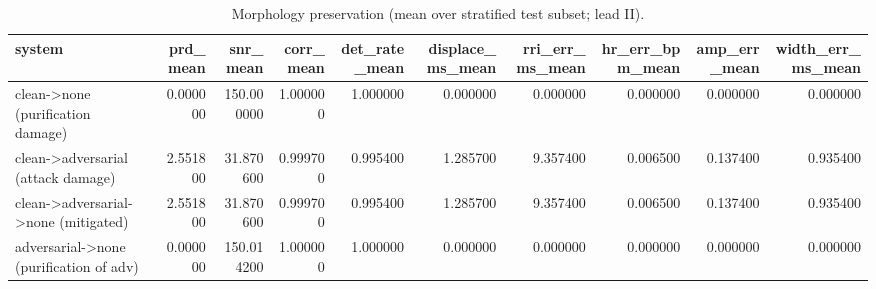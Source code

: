 \begin{table}[htbp]\centering\caption{Morphology preservation (mean over stratified test subset; lead II).}\label{tab:morph}
\begin{tabular}{lrrrrrrrrr}
\toprule
system & prd_mean & snr_mean & corr_mean & det_rate_mean & displace_ms_mean & rri_err_ms_mean & hr_err_bpm_mean & amp_err_mean & width_err_ms_mean \\
\midrule
clean->none (purification damage) & 0.000000 & 150.000000 & 1.000000 & 1.000000 & 0.000000 & 0.000000 & 0.000000 & 0.000000 & 0.000000 \\
clean->adversarial (attack damage) & 2.551800 & 31.870600 & 0.999700 & 0.995400 & 1.285700 & 9.357400 & 0.006500 & 0.137400 & 0.935400 \\
clean->adversarial->none (mitigated) & 2.551800 & 31.870600 & 0.999700 & 0.995400 & 1.285700 & 9.357400 & 0.006500 & 0.137400 & 0.935400 \\
adversarial->none (purification of adv) & 0.000000 & 150.014200 & 1.000000 & 1.000000 & 0.000000 & 0.000000 & 0.000000 & 0.000000 & 0.000000 \\
\bottomrule
\end{tabular}
\end{table}
